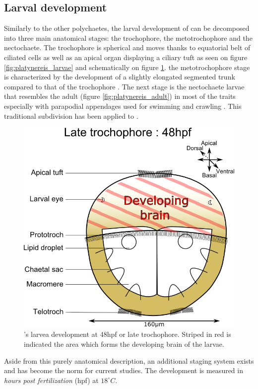      \subsection{Larval development}
    Similarly to the other polychaetes, the larval development of \platy{} can be decomposed into three main anatomical stages: the trochophore, the metotrochophore and the nectochaete. The trochophore is spherical and moves thanks to equatorial belt of ciliated cells as well as an apical organ displaying a ciliary tuft \cite{rouse99,nielsen04} as seen on figure \ref{fig:platynereis_larvae} and schematically on figure \ref{fig:platynereis_larvae_scheme}. the metotrochophore stage is characterized by the development of a slightly elongated segmented trunk compared to that of the trochophore \cite{hacker98}. The next stage is the nectochaete larvae that resembles the adult (figure \ref{fig:platynereis_adult}) in most of the traits especially with parapodial appendages used for swimming and crawling \cite{hacker98}. This traditional subdivision has been applied to \platy{} \cite{hauenschild69}.\\
    
\begin{figure}[bth]
\begin{center}
  \includegraphics[width=0.6\linewidth]{gfx/chapter1/larvae48hpf.png}
\end{center}
  \caption{\platyfull{}'s larvea development at 48hpf or late trochophore. Striped in red is indicated the area which forms the developing brain of the larvae.}
  \label{fig:platynereis_larvae_scheme}
\end{figure}
    
    Aside from this purely anatomical description, an additional staging system exists and has become the norm for current studies. The development is measured in \textit{hours post fertilization} (hpf) at $18^{\circ}C$.
    

